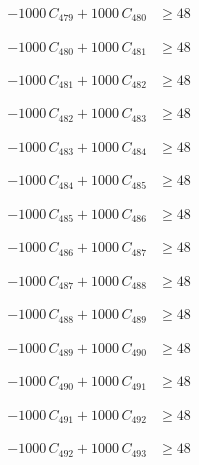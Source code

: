 \documentclass[a4paper,11pt]{article}
\begin{document}
\begin{align}
-1000\,C_{479} + 1000\,C_{480} &\geq 48 \nonumber
\end{align}

\begin{align}
-1000\,C_{480} + 1000\,C_{481} &\geq 48 \nonumber
\end{align}

\begin{align}
-1000\,C_{481} + 1000\,C_{482} &\geq 48 \nonumber
\end{align}

\begin{align}
-1000\,C_{482} + 1000\,C_{483} &\geq 48 \nonumber
\end{align}

\begin{align}
-1000\,C_{483} + 1000\,C_{484} &\geq 48 \nonumber
\end{align}

\begin{align}
-1000\,C_{484} + 1000\,C_{485} &\geq 48 \nonumber
\end{align}

\begin{align}
-1000\,C_{485} + 1000\,C_{486} &\geq 48 \nonumber
\end{align}

\begin{align}
-1000\,C_{486} + 1000\,C_{487} &\geq 48 \nonumber
\end{align}

\begin{align}
-1000\,C_{487} + 1000\,C_{488} &\geq 48 \nonumber
\end{align}

\begin{align}
-1000\,C_{488} + 1000\,C_{489} &\geq 48 \nonumber
\end{align}

\begin{align}
-1000\,C_{489} + 1000\,C_{490} &\geq 48 \nonumber
\end{align}

\begin{align}
-1000\,C_{490} + 1000\,C_{491} &\geq 48 \nonumber
\end{align}

\begin{align}
-1000\,C_{491} + 1000\,C_{492} &\geq 48 \nonumber
\end{align}

\begin{align}
-1000\,C_{492} + 1000\,C_{493} &\geq 48 \nonumber
\end{align}
\end{document}
